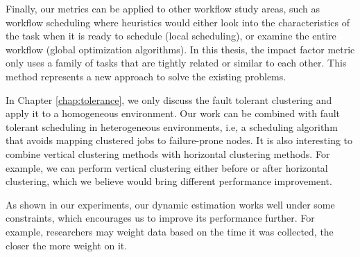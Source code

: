 Finally, our metrics can be applied to other workflow study areas, such as workflow scheduling where heuristics would either look into the characteristics of the task when it is ready to schedule (local scheduling), or examine the entire workflow (global optimization algorithms). In this thesis, the impact factor metric only uses a family of tasks that are tightly related or similar to each other. This method represents a new approach to solve the existing problems. 


In Chapter \ref{chap:tolerance}, we only discuss the fault tolerant clustering and apply it to a homogeneous environment. Our work can be combined with fault tolerant scheduling in heterogeneous environments, i.e, a scheduling algorithm that avoids mapping clustered jobs to failure-prone nodes. It is also interesting to combine vertical clustering methods with horizontal clustering methods. For example, we can perform vertical clustering either before or after horizontal clustering, which we believe would bring different performance improvement. 

As shown in our experiments, our dynamic estimation works well under some constraints, which encourages us to improve its performance further. For example, researchers may weight data based on the time it was collected, the closer the more weight on it. 



 